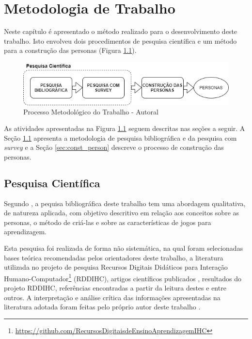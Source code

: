 \chapter{Metodologia de Trabalho}
\label{chap:Metodo}

Neste capítulo é apresentado o método realizado para o desenvolvimento deste trabalho. Isto envolveu dois procedimentos de pesquisa científica e um método para a construção das personas (Figura \ref{Fig:geral_flow.png}).

\begin{figure}[htbp]
	\centering
	\includegraphics[keepaspectratio=true,scale=0.65]{figuras/metodologia/fluxo geral.png}
	\caption{Processo Metodológico do Trabalho - Autoral}
	\label{Fig:geral_flow.png}
\end{figure}

As atividades apresentadas na Figura \ref{Fig:geral_flow.png} seguem descritas nas seções a seguir. A Seção \ref{sec:pesq_cient} apresenta a metodologia de pesquisa bibliográfica e da pesquisa com \textit{survey} e a Seção \ref{sec:const_person} descreve o processo de construção das personas.


\section{Pesquisa Científica} 
\label{sec:pesq_cient}

Segundo , a pequisa bibliográfica deste trabalho tem uma abordagem qualitativa, de natureza aplicada, com objetivo descritivo em relação aos conceitos sobre as personas, o método de criá-las e sobre as características de jogos para aprendizagem.

Esta pesquisa foi realizada de forma não sistemática, na qual foram selecionadas bases teórica \cite{barbosa_silva, BarbosaEtAl2021, cooper07} recomendadas pelos orientadores deste trabalho, a literatura utilizada no projeto de pesquisa Recursos Digitais Didáticos para Interação Humano-Computador\footnote{\url{https://github.com/RecursosDigitaisdeEnsinoAprendizagemIHC}} (RDDIHC), artigos científicos publicados \cite{deSales_SousaeSilva_2020, silva_sales_mendes2021}, resultados do projeto RDDIHC, referências encontradas a partir da leitura destes e entre outros. A interpretação e análise crítica das informações apresentadas na literatura adotada foram feitas pelo próprio autor deste trabalho \cite{ROTHER2007}. 

